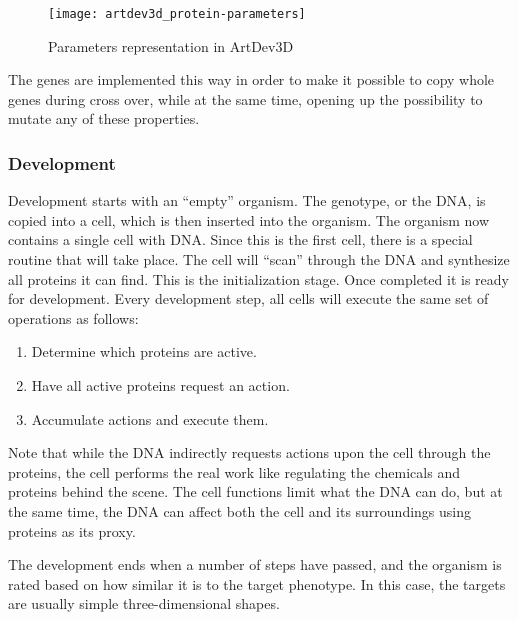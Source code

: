 \begin{figure}[!ht]
	\centering
	\texttt{[image: artdev3d\_protein-parameters]}
	\caption{Parameters representation in ArtDev3D}
	\label{fig:artdev3d_protein-parameters}
\end{figure}

The genes are implemented this way in order to make it possible to copy whole genes during cross over, while at the same time, opening up the possibility to mutate any of these properties.

\subsubsection{Development}
Development starts with an ``empty'' organism. The genotype, or the DNA, is copied into a cell, which is then inserted into the organism. The organism now contains a single cell with DNA. Since this is the first cell, there is a special routine that will take place. The cell will ``scan'' through the DNA and synthesize all proteins it can find. This is the initialization stage. Once completed it is ready for development. Every development step, all cells will execute the same set of operations as follows:

\begin{enumerate}
	\itemsep=0pt
	\item Determine which proteins are active.
	\item Have all active proteins request an action.
	\item Accumulate actions and execute them.
\end{enumerate}

Note that while the DNA indirectly requests actions upon the cell through the proteins, the cell performs the real work like regulating the chemicals and proteins behind the scene. The cell functions limit what the DNA can do, but at the same time, the DNA can affect both the cell and its surroundings using proteins as its proxy.

The development ends when a number of steps have passed, and the organism is rated based on how similar it is to the target phenotype. In this case, the targets are usually simple three-dimensional shapes.

